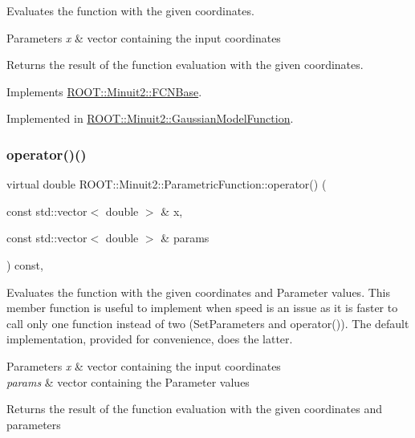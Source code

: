 Evaluates the function with the given coordinates.


\begin{DoxyParams}{Parameters}
{\em x} & vector containing the input coordinates\\
\hline
\end{DoxyParams}
\begin{DoxyReturn}{Returns}
the result of the function evaluation with the given coordinates. 
\end{DoxyReturn}


Implements \mbox{\hyperlink{classROOT_1_1Minuit2_1_1FCNBase_ae4a86bd94d0d0f5ca6fc8f8ab2bb43cd}{R\+O\+O\+T\+::\+Minuit2\+::\+F\+C\+N\+Base}}.



Implemented in \mbox{\hyperlink{classROOT_1_1Minuit2_1_1GaussianModelFunction_af4102c5eecd496d63c5592f7519248ce}{R\+O\+O\+T\+::\+Minuit2\+::\+Gaussian\+Model\+Function}}.

\mbox{\label{classROOT_1_1Minuit2_1_1ParametricFunction_a5fab6e804e0f93bd593580f582b0f7c5}} 
\subsubsection{\texorpdfstring{operator()()}{operator()()}\hspace{0.1cm}{\footnotesize\ttfamily [3/4]}}
{\footnotesize\ttfamily virtual double R\+O\+O\+T\+::\+Minuit2\+::\+Parametric\+Function\+::operator() (\begin{DoxyParamCaption}\item[{const std\+::vector$<$ double $>$ \&}]{x,  }\item[{const std\+::vector$<$ double $>$ \&}]{params }\end{DoxyParamCaption}) const\hspace{0.3cm}{\ttfamily [inline]}, {\ttfamily [virtual]}}

Evaluates the function with the given coordinates and Parameter values. This member function is useful to implement when speed is an issue as it is faster to call only one function instead of two (Set\+Parameters and operator()). The default implementation, provided for convenience, does the latter.


\begin{DoxyParams}{Parameters}
{\em x} & vector containing the input coordinates\\
\hline
{\em params} & vector containing the Parameter values\\
\hline
\end{DoxyParams}
\begin{DoxyReturn}{Returns}
the result of the function evaluation with the given coordinates and parameters 
\end{DoxyReturn}


